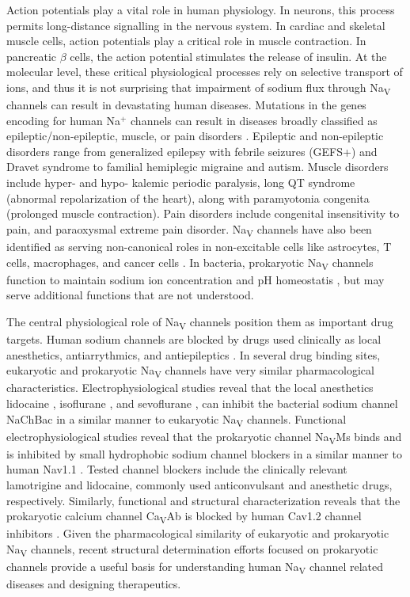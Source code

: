 \begin{refsection}
Action potentials play a vital role in human physiology. In neurons, this process permits long-distance signalling in the nervous system. In cardiac and skeletal muscle cells, action potentials play a critical role in muscle contraction. In pancreatic $\beta$ cells, the action potential stimulates the release of insulin. At the molecular level, these critical physiological processes rely on selective transport of ions, and thus it is not surprising that impairment of sodium flux through Na\textsubscript{V} channels can result in devastating human diseases. Mutations in the genes encoding for human Na$^+$ channels can result in diseases broadly classified as epileptic/non-epileptic, muscle, or pain disorders \cite{Ashcroft:2000ts}. Epileptic and non-epileptic disorders range from generalized epilepsy with febrile seizures (GEFS+) and Dravet syndrome to familial hemiplegic migraine and autism. Muscle disorders include hyper- and hypo- kalemic periodic paralysis, long QT syndrome (abnormal repolarization of the heart), along with paramyotonia congenita (prolonged muscle contraction). Pain disorders include congenital insensitivity to pain, and paraoxysmal extreme pain disorder. Na\textsubscript{V} channels have also been identified as serving non-canonical roles in non-excitable cells like astrocytes, T cells, macrophages, and cancer cells \cite{Black:2013gp}. In bacteria, prokaryotic Na\textsubscript{V} channels function to maintain sodium ion concentration and pH homeostatis \cite{Ito:2004da}, but may serve additional functions that are not understood.

The central physiological role of Na\textsubscript{V} channels position them as important drug targets. Human sodium channels are blocked by drugs used clinically as local anesthetics, antiarrythmics, and antiepileptics \cite{Catterall:2014eq}. In several drug binding sites, eukaryotic and prokaryotic Na\textsubscript{V} channels have very similar pharmacological characteristics. Electrophysiological studies reveal that the local anesthetics lidocaine \cite{Lee:2012bs}, isoflurane \cite{Ouyang:2007he}, and sevoflurane \cite{Barber:2014us}, can inhibit the bacterial sodium channel NaChBac in a similar manner to eukaryotic Na\textsubscript{V} channels. Functional electrophysiological studies reveal that the prokaryotic channel Na\textsubscript{V}Ms binds and is inhibited by small hydrophobic sodium channel blockers in a similar manner to human Nav1.1 \cite{Bagneris:2014ks}. Tested channel blockers include the clinically relevant lamotrigine and lidocaine, commonly used anticonvulsant and anesthetic drugs, respectively. Similarly, functional and structural characterization reveals that the prokaryotic calcium channel Ca\textsubscript{V}Ab is blocked by human Cav1.2 channel inhibitors \cite{Tang:2016el}. Given the pharmacological similarity of eukaryotic and prokaryotic Na\textsubscript{V} channels, recent structural determination efforts focused on prokaryotic channels provide a useful basis for understanding human Na\textsubscript{V} channel related diseases and designing therapeutics.


\end{refsection}
